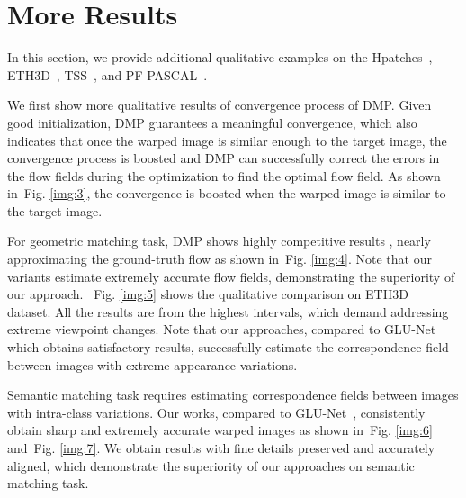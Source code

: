 \documentclass[10pt,twocolumn,letterpaper]{article}
\newcommand{\figref}[1]{Fig. \ref{#1}}
\begin{document}
\section{More Results}\label{sec:4}
In this section, we provide additional qualitative examples on the Hpatches~\cite{balntas2017hpatches}, ETH3D~\cite{schops2017multi}, TSS~\cite{taniai2016joint}, and PF-PASCAL~\cite{ham2016proposal}.

We first show more qualitative results of convergence process of DMP. Given good initialization, DMP guarantees a meaningful convergence, which also indicates that once the warped image is similar enough to the target image, the convergence process is boosted and DMP can successfully correct the errors in the flow fields during the optimization to find the optimal flow field. As shown in~\figref{img:3}, the convergence is boosted when the warped image is similar to the target image.

For geometric matching task, DMP shows highly competitive results , nearly approximating the ground-truth flow as shown in~\figref{img:4}. Note that our variants estimate extremely accurate flow fields, demonstrating the superiority of our approach. ~\figref{img:5} shows the qualitative comparison on ETH3D~\cite{schops2017multi} dataset. All the results are from the highest intervals, which demand addressing extreme viewpoint changes. Note that our approaches, compared to GLU-Net~\cite{truong2020glu} which obtains satisfactory results, successfully estimate the correspondence field between images with extreme appearance variations.

Semantic matching task requires estimating correspondence fields between images with intra-class variations. Our works, compared to GLU-Net~\cite{truong2020glu}, consistently obtain sharp and extremely accurate warped images as shown in~\figref{img:6} and~\figref{img:7}. We obtain results with fine details preserved and accurately aligned, which demonstrate the superiority of our approaches on semantic matching task.
\end{document}
